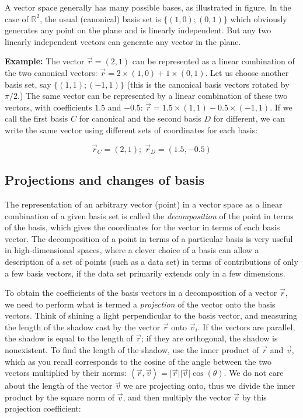 \documentclass[
  letterpaper,
  DIV=11,
  numbers=noendperiod]{scrreprt}
\begin{document}
A vector space generally has many possible bases, as illustrated in
figure. In the case of \(\mathbb{R}^2\), the usual (canonical) basis set
is \(\{(1,0); (0,1)\}\) which obviously generates any point on the plane
and is linearly independent. But any two linearly independent vectors
can generate any vector in the plane.

\textbf{Example:} The vector \(\vec r = (2,1)\) can be represented as a
linear combination of the two canonical vectors:
\(\vec r = 2\times (1,0)+1\times (0,1)\). Let us choose another basis
set, say \(\{(1,1); (-1,1)\}\) (this is the canonical basis vectors
rotated by \(\pi/2\).) The same vector can be represented by a linear
combination of these two vectors, with coefficients \(1.5\) and
\(-0.5\): \(\vec r = 1.5\times (1,1) - 0.5 \times (-1,1)\). If we call
the first basis \(C\) for canonical and the second basis \(D\) for
different, we can write the same vector using different sets of
coordinates for each basis:

\[ 
\vec r_{C} = (2,1); \; \vec r_D = (1.5, -0.5)
\]

\subsection{Projections and changes of
basis}\label{projections-and-changes-of-basis}

The representation of an arbitrary vector (point) in a vector space as a
linear combination of a given basis set is called the
\emph{decomposition} of the point in terms of the basis, which gives the
coordinates for the vector in terms of each basis vector. The
decomposition of a point in terms of a particular basis is very useful
in high-dimensional spaces, where a clever choice of a basis can allow a
description of a set of points (such as a data set) in terms of
contributions of only a few basis vectors, if the data set primarily
extends only in a few dimensions.

To obtain the coefficients of the basis vectors in a decomposition of a
vector \(\vec r\), we need to perform what is termed a \emph{projection}
of the vector onto the basis vectors. Think of shining a light
perpendicular to the basis vector, and measuring the length of the
shadow cast by the vector \(\vec r\) onto \(\vec v_i\). If the vectors
are parallel, the shadow is equal to the length of \(\vec r\); if they
are orthogonal, the shadow is nonexistent. To find the length of the
shadow, use the inner product of \(\vec r\) and \(\vec v\), which as you
recall corresponds to the cosine of the angle between the two vectors
multiplied by their norms:
\(\left \langle \vec r, \vec v\right \rangle =\vert\vec r\vert \vert\vec v\vert\cos(\theta)\).
We do not care about the length of the vector \(\vec v\) we are
projecting onto, thus we divide the inner product by the square norm of
\(\vec v\), and then multiply the vector \(\vec v\) by this projection
coefficient:
\end{document}
